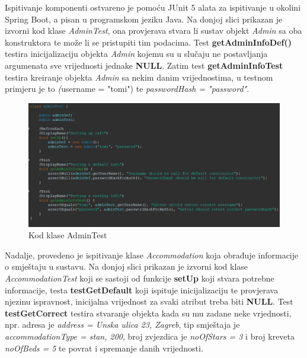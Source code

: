 			Ispitivanje komponenti ostvareno je pomoću JUnit 5 alata za ispitivanje u okolini Spring Boot, a pisan u programskom jeziku Java. \newline
			Na donjoj slici prikazan je izvorni kod klase \textit{AdminTest}, ona provjerava stvara li sustav objekt \textit{Admin} sa oba konstruktora te može li se pristupiti tim podacima. Test \textbf{getAdminInfoDef()} testira inicijalizaciju objekta \textit{Admin} kojemu su u slučaju ne postavljanja argumenata sve vrijednosti jednake \textbf{NULL}. Zatim test \textbf{getAdminInfoTest} testira kreiranje objekta \textit{Admin} sa nekim danim vrijednostima, u testnom primjeru je to \textit(username = "tomi") te \textit{passwordHash = "password"}. 
			
			\begin{figure}[H]
				\includegraphics[width=\textwidth]{slike/adminTest.JPG}
				\caption{Kod klase AdminTest}
				\label{adminTest}
			\end{figure}
			
			Nadalje, provedeno je ispitivanje klase \textit{Accommodation} koja obrađuje informacije o smještaju u sustavu. Na donjoj slici prikazan je izvorni kod klase \textit{AccommodationTest} koji se sastoji od funkcije \textbf{setUp} koji stvara potrebne informacije, testa \textbf{testGetDefault} koji ispituje inicijalizaciju te provjerava njezinu ispravnost, inicijalna vrijednost za svaki atribut treba biti \textbf{NULL}. Test \textbf{testGetCorrect} testira stvaranje objekta kada su mu zadane neke vrjednosti, npr. adresa je \textit{address = Unska ulica 23, Zagreb}, tip smještaja je \textit{accommodationType = stan, 200}, broj zvjezdica je \textit{noOfStars = 3} i broj kreveta \textit{noOfBeds = 5} te povrat i spremanje danih vrijednosti.
			
